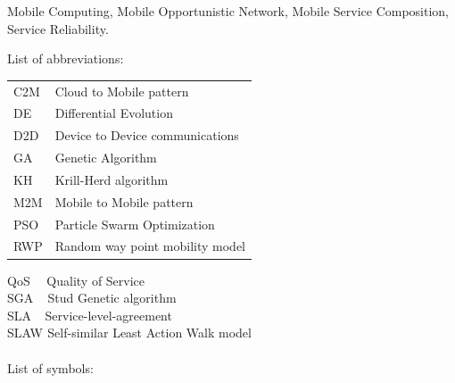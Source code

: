 \documentclass[journal]{IEEEtran}
\begin{document}
\begin{IEEEkeywords}
Mobile Computing, Mobile Opportunistic Network, Mobile Service Composition, Service Reliability.
\end{IEEEkeywords}

\noindent List of abbreviations:
~\\

\noindent
\begin{tabular}{@{} l p{7.36cm} }
C2M   &   Cloud to Mobile pattern\\
DE    &   Differential Evolution \\
D2D   &   Device to Device communications \\
GA    &   Genetic Algorithm \\
KH    &   Krill-Herd algorithm \\
M2M   &   Mobile to Mobile pattern \\
PSO   &   Particle Swarm Optimization \\
RWP   &   Random way point mobility model \\
\end{tabular}


\noindent QoS $\ \; \,$ Quality of Service \\
\noindent SGA $\ \; $ Stud Genetic algorithm \\
\noindent SLA $\ \ $ Service-level-agreement \\
\noindent SLAW$\ \,$Self-similar Least Action Walk model \\

~\\
\noindent List of symbols: 
~\\
\end{document}
